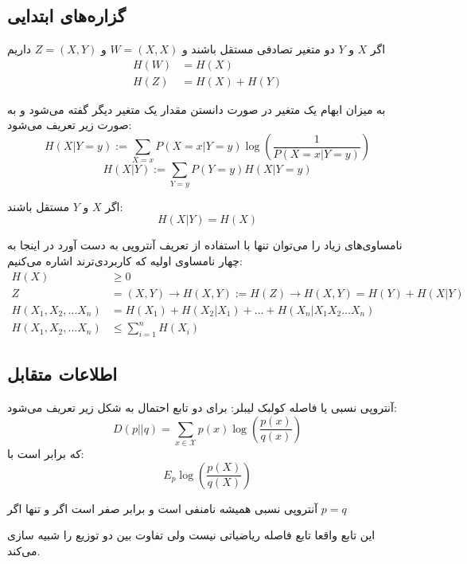 \subsection{گزاره‌های ابتدایی}
\begin{theorem}
اگر
$X$
و
$Y$
دو متغیر تصادفی مستقل باشند و
$W = (X, X)$
و
$Z = (X, Y)$
داریم
\begin{align*}
    H(W) &= H(X) \\
    H(Z) &= H(X) + H(Y)
\end{align*}
\end{theorem}
\begin{definition}
	به میزان ابهام یک متغیر در صورت دانستن مقدار یک متغیر دیگر گفته می‌شود و به صورت زیر تعریف می‌شود:
$$H(X | Y = y) := \sum_{X = x} P(X = x| Y = y) \log(\frac{1}{P(X = x| Y = y)})$$
$$H(X|Y) := \sum_{Y = y} P(Y = y) H(X | Y = y)$$
\end{definition}

\begin{theorem}
اگر
$X$
و
$Y$
مستقل باشند:
$$H(X|Y) = H(X)$$
\end{theorem}
\begin{theorem}
	نامساوی‌های زیاد را می‌توان تنها با استفاده از تعریف آنتروپی به دست آورد در اینجا به چهار نامساوی اولیه که کاربردی‌ترند اشاره می‌کنیم:
	\begin{align*}
H(X) &\geq 0 \\
Z &= (X, Y) \rightarrow H(X, Y) := H(Z) \rightarrow H(X, Y) = H(Y) + H(X|Y) \\
H(X_1, X_2, \dots X_n) &= H(X_1) + H(X_2 | X_1) + \dots + H(X_n | X_1 X_2 \dots X_n)\\
H(X_1, X_2, \dots X_n) &\leq \sum_{i = 1}^{n} H(X_i)
\end{align*}
\end{theorem}
\subsection{اطلاعات متقابل}
\begin{definition}
آنتروپی نسبی یا فاصله کولبک لیبلر: برای دو تابع احتمال به شکل زیر تعریف می‌شود:
$$
D(p||q) = \sum_{x \in \mathcal{X}} p(x) \log(\dfrac{p(x)}{q(x)})
$$
که برابر است با:
$$E_p \log(\dfrac{p(X)}{q(X)})$$
\end{definition}
\begin{theorem}
آنتروپی نسبی همیشه نامنفی است و برابر صفر است اگر و تنها اگر
$p = q$
\end{theorem}
این تابع واقعا تابع فاصله ریاضیاتی نیست ولی تفاوت بین دو توزیع را شبیه سازی می‌کند.

